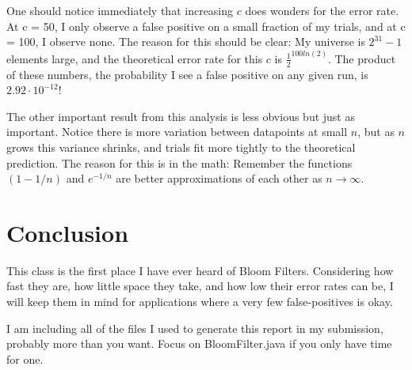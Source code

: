 \documentclass[]{article}
\begin{document}
  \vspace{-4mm}
  One should notice immediately that increasing $c$ does wonders for the error rate. At c = 50, I only observe a false positive on a small fraction of my trials, and at c = 100, I observe none. The reason for this should be clear: My universe is $2^{31}-1$ elements large, and the theoretical error rate for this $c$ is $\frac{1}{2}^{100ln(2)}$. The product of these numbers, the probability I see a false positive on any given run, is $2.92 \cdot 10^{-12}$!

  The other important result from this analysis is less obvious but just as important. Notice there is more variation between datapoints at small $n$, but as $n$ grows this variance shrinks, and trials fit more tightly to the theoretical prediction. The reason for this is in the math: Remember the functions $(1-1/n)$ and $e^{-1/n}$ are better approximations of each other as $n \rightarrow \infty$.
  \vspace{-4mm}

  \section{Conclusion}
  \vspace{-2mm}
  This class is the first place I have ever heard of Bloom Filters. Considering how fast they are, how little space they take, and how low their error rates can be, I will keep them in mind for applications where a very few false-positives is okay.

  I am including all of the files I used to generate this report in my submission, probably more than you want. Focus on BloomFilter.java if you only have time for one.
\end{document}
